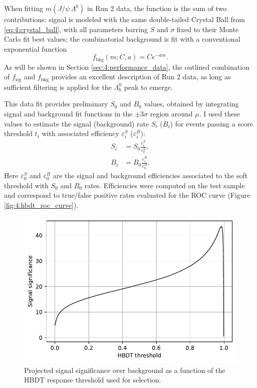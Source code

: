 When fitting $m(J/\psi\,\Lambda^0)$ in Run 2 data, the function is the sum of two contributions:
signal is modeled with the same double-tailed Crystal Ball from \eqref{eq:4:crystal_ball}, with all parameters barring $S$ and $\sigma$ fixed to their Monte Carlo fit best values;
the combinatorial background is fit with a conventional exponential function
\begin{equation}
	f_\text{bkg} (m;C,a) = C e^{-a m}.
	\label{eq:4:exponential}
\end{equation}
As will be shown in Section \ref{sec:4:performance_data}, the outlined combination of $f_\text{sig}$ and $f_\text{bkg}$ provides an excellent description of Run 2 data, as long as sufficient filtering is applied for the $\Lambda_b^0$ peak to emerge.

This data fit provides preliminary $S_0$ and $B_0$ values, obtained by integrating signal and background fit functions in the $\pm 3\sigma$ region around $\mu$.
I used these values to estimate the signal (background) rate $S_i$ ($B_i$) for events passing a score threshold $t_i$ with associated efficiency $\varepsilon_i^S$ ($\varepsilon_i^B$):
\begin{subequations}
\begin{align}
	S_i &= S_0 \frac{\varepsilon_i^S}{\varepsilon_0^S}, \\
	B_i &= B_0 \frac{\varepsilon_i^B}{\varepsilon_0^B}.
\end{align}
\end{subequations}
Here $\varepsilon_0^S$ and $\varepsilon_0^B$ are the signal and background efficiencies associated to the soft threshold with $S_0$ and $B_0$ rates.
Efficiencies were computed on the test sample and correspond to true/false positive rates evaluated for the ROC curve (Figure \ref{fig:4:hbdt_roc_curve}).

\begin{figure}
	\centering
	\includegraphics[width=.6\textwidth]{graphics/04-event_selection/HBDT_signal_significance.pdf}
	\caption{Projected \demonstratorshort signal significance over background as a function of the HBDT response threshold used for selection.}
	\label{fig:4:signal_significance}
\end{figure}

